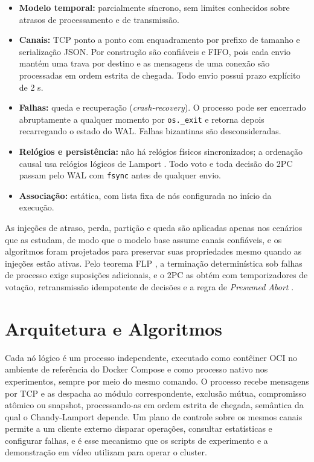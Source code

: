 \documentclass[conference]{IEEEtran}
\begin{document}
\begin{itemize}
    \item \textbf{Modelo temporal:} parcialmente síncrono, sem limites
    conhecidos sobre atrasos de processamento e de transmissão.
    \item \textbf{Canais:} TCP ponto a ponto com enquadramento por prefixo de
    tamanho e serialização JSON. Por construção são confiáveis e FIFO, pois
    cada envio mantém uma trava por destino e as mensagens de uma conexão são
    processadas em ordem estrita de chegada. Todo envio possui prazo
    explícito de 2 s.
    \item \textbf{Falhas:} queda e recuperação (\emph{crash-recovery}). O
    processo pode ser encerrado abruptamente a qualquer momento por
    \texttt{os.\_exit} e retorna depois recarregando o estado do WAL. Falhas
    bizantinas são desconsideradas.
    \item \textbf{Relógios e persistência:} não há relógios físicos
    sincronizados; a ordenação causal usa relógios lógicos de Lamport
    \cite{lamport1978time}. Todo voto e toda decisão do 2PC passam pelo WAL com
    \texttt{fsync} antes de qualquer envio.
    \item \textbf{Associação:} estática, com lista fixa de nós configurada no
    início da execução.
\end{itemize}

As injeções de atraso, perda, partição e queda são aplicadas apenas nos
cenários que as estudam, de modo que o modelo base assume canais confiáveis,
e os algoritmos foram projetados para preservar suas propriedades mesmo
quando as injeções estão ativas. Pelo teorema FLP \cite{fischer1985impossibility},
a terminação determinística sob falhas de processo exige suposições adicionais,
e o 2PC as obtém com temporizadores de votação, retransmissão idempotente de
decisões e a regra de \emph{Presumed Abort} \cite{gray1978notes}.

\section{Arquitetura e Algoritmos}
Cada nó lógico é um processo independente, executado como contêiner OCI no
ambiente de referência do Docker Compose e como processo nativo nos
experimentos, sempre por meio do mesmo comando. O processo recebe mensagens
por TCP e as despacha ao módulo correspondente, exclusão mútua, compromisso
atômico ou snapshot, processando-as em ordem estrita de chegada, semântica da
qual o Chandy-Lamport depende. Um plano de controle sobre os mesmos canais
permite a um cliente externo disparar operações, consultar estatísticas e
configurar falhas, e é esse mecanismo que os scripts de experimento e a
demonstração em vídeo utilizam para operar o cluster.
\end{document}
